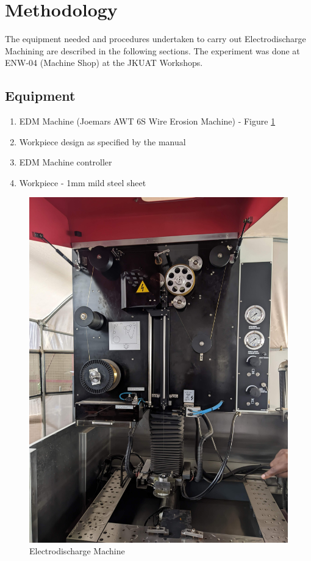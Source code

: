 \section{Methodology}
\lhead{\leftmark}
The equipment needed and procedures undertaken to carry out Electrodischarge Machining are described in the following sections. The experiment was done at ENW-04 (Machine Shop) at the JKUAT Workshops.
\subsection{Equipment}
\begin{enumerate}
\item EDM Machine (Joemars AWT 6S Wire Erosion Machine) - Figure \ref{fig:edmmachine}
\item Workpiece design as specified by the manual
\item EDM Machine controller 
\item Workpiece - 1mm mild steel sheet
\end{enumerate}
\begin{figure}[h!]
	\centering
	\includegraphics[width=0.7\linewidth]{Figures/edmmachine}
	\caption[EDM Machine]{Electrodischarge Machine}
	\label{fig:edmmachine}
\end{figure}
